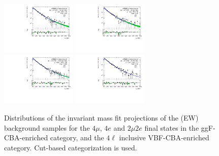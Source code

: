 \begin{figure}[htbp]
    \centering
    \includegraphics[width=0.32\textwidth]{figures/HMHZZ/background/cut_based/bkg_shape_qqZZEW_ggF_4mu_180_to_2200_log.pdf}
    \includegraphics[width=0.32\textwidth]{figures/HMHZZ/background/cut_based/bkg_shape_qqZZEW_ggF_4e_180_to_2200_log.pdf} \\
    \includegraphics[width=0.32\textwidth]{figures/HMHZZ/background/cut_based/bkg_shape_qqZZEW_ggF_2mu2e_180_to_2200_log.pdf}
    \includegraphics[width=0.32\textwidth]{figures/HMHZZ/background/cut_based/bkg_shape_qqZZEW_VBF_incl_180_to_2200_log.pdf}
    \caption{Distributions of the \mfl invariant mass fit projections of the \qqZZ (EW) background samples for the
    $4\mu$, $4e$ and $2\mu 2e$ final states in the ggF-CBA-enriched category, and the $4\ell$ inclusive VBF-CBA-enriched category. 
    Cut-based categorization is used.} 
    \label{fig:qqZZEW_m4l_shape_all_cut_based}
\end{figure}

